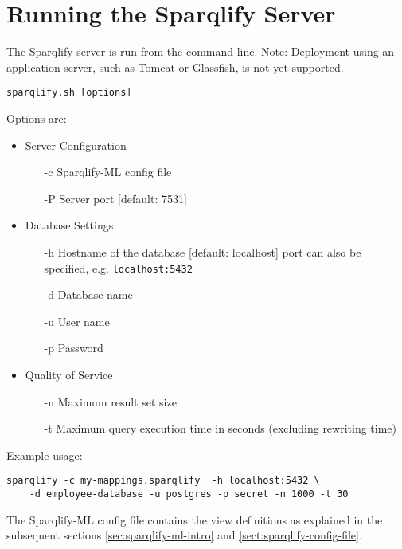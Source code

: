 \documentclass[a4paper,twoside,bibtotoc,abstracton,12pt,BCOR=15mm]{scrreprt}
\begin{document}
\section{Running the Sparqlify Server}
The Sparqlify server is run from the command line.
Note: Deployment using an application server, such as Tomcat or Glassfish, is not yet supported. 
\begin{verbatim}
sparqlify.sh [options]
\end{verbatim}

Options are:
\begin{itemize}
  \item Server Configuration
	\begin{itemize}
        \item[-c] Sparqlify-ML config file
        \item[-P] Server port [default: 7531]
    \end{itemize}

  \item Database Settings
	\begin{itemize}
      \item[-h] Hostname of the database [default: localhost]\newline
      port can also be specified, e.g. \texttt{localhost:5432}
      \item[-d] Database name
      \item[-u] User name
      \item[-p] Password
	\end{itemize}
	
  \item Quality of Service
    \begin{itemize}
      \item[-n] Maximum result set size
      \item[-t] Maximum query execution time in seconds (excluding rewriting
      time)
    \end{itemize}
\end{itemize}

\noindent Example usage:
\begin{lstlisting}
sparqlify -c my-mappings.sparqlify  -h localhost:5432 \
    -d employee-database -u postgres -p secret -n 1000 -t 30 
\end{lstlisting}

The Sparqlify-ML config file contains the view definitions as explained in the subsequent sections
\autoref{sec:sparqlify-ml-intro} and \autoref{sect:sparqlify-config-file}. 
\end{document}
